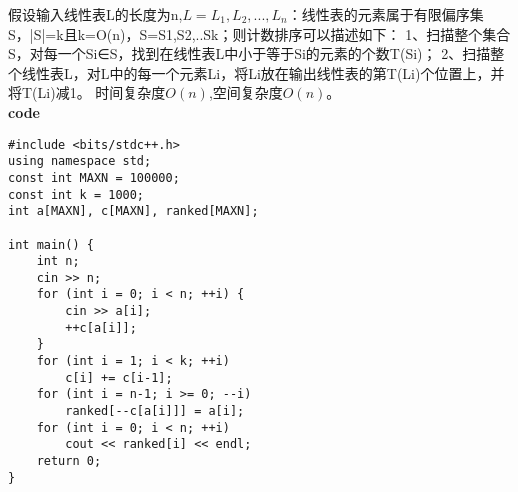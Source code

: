 \documentclass[UTF8,a4paper]{article}
\begin{document}
假设输入线性表L的长度为n,$L=L_1,L_2,...,L_n$：线性表的元素属于有限偏序集S，|S|=k且k=O(n)，S={S1,S2,..Sk}；则计数排序可以描述如下：
1、扫描整个集合S，对每一个Si∈S，找到在线性表L中小于等于Si的元素的个数T(Si)；
2、扫描整个线性表L，对L中的每一个元素Li，将Li放在输出线性表的第T(Li)个位置上，并将T(Li)减1。
时间复杂度$O(n)$,空间复杂度$O(n)$。\\
\textbf{code}\\
\begin{lstlisting}
#include <bits/stdc++.h>
using namespace std;
const int MAXN = 100000;
const int k = 1000; 
int a[MAXN], c[MAXN], ranked[MAXN];
 
int main() {
    int n;
    cin >> n;
    for (int i = 0; i < n; ++i) {
        cin >> a[i]; 
        ++c[a[i]];
    }
    for (int i = 1; i < k; ++i)
        c[i] += c[i-1];
    for (int i = n-1; i >= 0; --i)
        ranked[--c[a[i]]] = a[i];
    for (int i = 0; i < n; ++i)
        cout << ranked[i] << endl;
    return 0;
}
\end{lstlisting}
\end{document}
